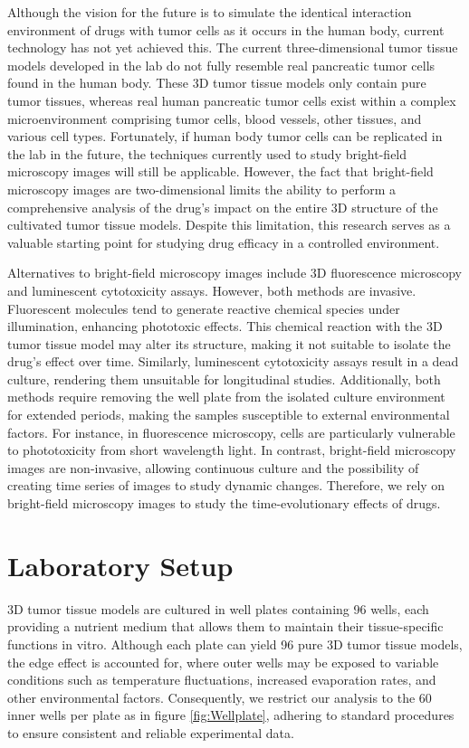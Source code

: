 Although the vision for the future is to simulate the identical interaction environment of drugs with tumor cells as it occurs in the human body, current technology has not yet achieved this. The current three-dimensional tumor tissue models developed in the lab do not fully resemble real pancreatic tumor cells found in the human body. These 3D tumor tissue models only contain pure tumor tissues, whereas real human pancreatic tumor cells exist within a complex microenvironment comprising tumor cells, blood vessels, other tissues, and various cell types.
Fortunately, if human body tumor cells can be replicated in the lab in the future, the techniques currently used to study bright-field microscopy images will still be applicable. However, the fact that bright-field microscopy images are two-dimensional limits the ability to perform a comprehensive analysis of the drug's impact on the entire 3D structure of the cultivated tumor tissue models. Despite this limitation, this research serves as a valuable starting point for studying drug efficacy in a controlled environment. 

Alternatives to bright-field microscopy images include 3D fluorescence microscopy and luminescent cytotoxicity assays. However, both methods are invasive. Fluorescent molecules tend to generate reactive chemical species under illumination, enhancing phototoxic effects. This chemical reaction with the 3D tumor tissue model may alter its structure, making it not suitable to isolate the drug's effect over time. Similarly, luminescent cytotoxicity assays result in a dead culture, rendering them unsuitable for longitudinal studies. Additionally, both methods require removing the well plate from the isolated culture environment for extended periods, making the samples susceptible to external environmental factors. For instance, in fluorescence microscopy, cells are particularly vulnerable to phototoxicity from short wavelength light. In contrast, bright-field microscopy images are non-invasive, allowing continuous culture and the possibility of creating time series of images to study dynamic changes. Therefore, we rely on bright-field microscopy images to study the time-evolutionary effects of drugs.

\section{Laboratory Setup}
\label{sec:lab-setup}
3D tumor tissue models are cultured in well plates containing 96 wells, each providing a nutrient medium that allows them to maintain their tissue-specific functions in vitro. Although each plate can yield 96 pure 3D tumor tissue models, the edge effect is accounted for, where outer wells may be exposed to variable conditions such as temperature fluctuations, increased evaporation rates, and other environmental factors. Consequently, we restrict our analysis to the 60 inner wells per plate as in figure \ref{fig:Wellplate}, adhering to standard procedures to ensure consistent and reliable experimental data. 

